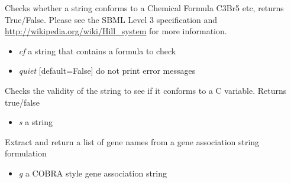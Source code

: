 \documentclass[a4paper,11pt,english]{sphinxmanual}
\begin{document}

\begin{fulllineitems}
\label{modules_doc:cbmpy.CBCommon.checkChemFormula}
Checks whether a string conforms to a Chemical Formula C3Br5 etc, returns True/False. Please see the SBML
Level 3 specification and \href{http://wikipedia.org/wiki/Hill\_system}{http://wikipedia.org/wiki/Hill\_system} for more information.
\begin{itemize}
\item {} 
\emph{cf} a string that contains a formula to check

\item {} 
\emph{quiet} {[}default=False{]} do not print error messages

\end{itemize}

\end{fulllineitems}


\begin{fulllineitems}
\label{modules_doc:cbmpy.CBCommon.checkId}
Checks the validity of the string to see if it conforms to a C variable. Returns true/false
\begin{itemize}
\item {} 
\emph{s} a string

\end{itemize}

\end{fulllineitems}


\begin{fulllineitems}
\label{modules_doc:cbmpy.CBCommon.extractGeneIdsFromString}
Extract and return a list of gene names from a gene association string formulation
\begin{itemize}
\item {} 
\emph{g} a COBRA style gene association string

\end{itemize}

\end{fulllineitems}
\end{document}

